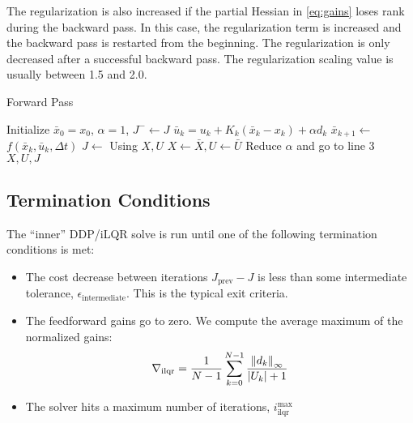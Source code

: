\documentclass[../root.tex]{subfiles}
\begin{document}
    The regularization is also increased if the partial Hessian in
    \eqref{eq:gains} loses rank during the backward pass. In this case, the
    regularization term is increased and the backward pass is restarted from
    the beginning. The regularization is only decreased after a successful
    backward pass. The regularization scaling value is usually between 1.5
    and 2.0.

    \begin{algorithm}
    \begin{algorithmic}[1]
    \caption{Forward Pass} \label{alg:FP}
        \State Initialize $\bar{x}_0 = x_0$, $\alpha = 1$, $J^{-} \leftarrow J$
            \State $\bar{u}_k = u_k + K_k(\bar{x}_k - x_k) + \alpha d_k$
            \State $\bar{x}_{k+1} \leftarrow$ $f(\bar{x}_k, \bar{u}_k, \Delta t)$
        \EndFor
        \State $J \leftarrow$ Using $X, U$
            \State $X \leftarrow \bar{X}, U \leftarrow \bar{U}$
        \Else
            \State Reduce $\alpha$ and go to line 3
        \EndIf\\
        \Return $X,U,J$
    \EndFunction
    \end{algorithmic}
    \end{algorithm}


\subsection{Termination Conditions} \label{term_conditions}
The ``inner'' DDP/iLQR solve is run until one of the following termination
conditions is met:
\begin{itemize}
    \item The cost decrease between iterations $J_\text{prev} - J$ is less
    than some intermediate tolerance, $\epsilon_\text{intermediate}$. This is
    the typical exit criteria.
    \item The feedforward gains go to zero. We compute the average maximum of
    the normalized gains:
        \begin{equation} \label{eq:ilqr_grad}
            \nabla_\text{ilqr} = \frac{1}{N-1} \sum_{k=0}^{N-1} \frac{\norm{d_k}_\infty}{\abs{U_k}+1}   
        \end{equation}
    \item The solver hits a maximum number of iterations,
    $i^\text{max}_\text{ilqr}$
\end{itemize}
\end{document}
